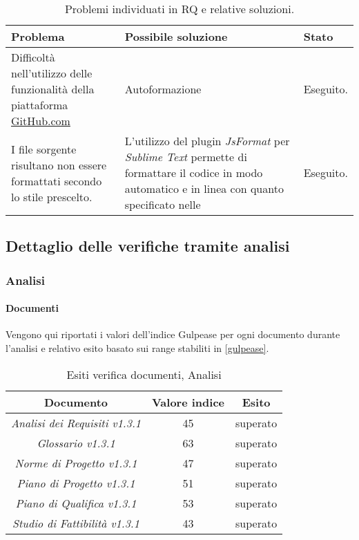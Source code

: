 		\begin{table}[H]
	    \begin{tabular}{ | p{5cm} | p{5cm} | p{2cm} | }
			\hline
			Problema & Possibile soluzione & Stato \\ \hline
			Difficoltà nell'utilizzo delle funzionalità della piattaforma \url{GitHub.com} & Autoformazione & Eseguito. \\ \hline
			I file sorgente risultano non essere formattati secondo lo stile prescelto. & L'utilizzo del plugin \emph{JsFormat} per \emph{Sublime Text} permette di formattare il codice in modo automatico e in linea con quanto specificato nelle \NormeDiProgetto{} & Eseguito. \\ \hline
	    \end{tabular}
	    	\caption{Problemi individuati in RQ e relative soluzioni.}
		\end{table}

	 
	 \subsection{Dettaglio delle verifiche tramite analisi}
	 \label{DettaglioVerificheAnalisi}
	 
	 	\subsubsection{Analisi}
	 	\paragraph{Documenti}
	 	Vengono qui riportati i valori dell’indice Gulpease per ogni documento durante l'analisi e relativo esito basato sui range stabiliti in \ref{gulpease}.
	
		\begin{table}[H]
		\centering
		\begin{tabular}{ | c | c | c | }
	    \hline
	    Documento & Valore indice & Esito \\ \hline
	     \emph{Analisi dei Requisiti v1.3.1} & 45 &  superato \\ \hline
	     \emph{Glossario v1.3.1} & 63 &  superato \\ \hline
	     \emph{Norme di Progetto v1.3.1} & 47 &  superato \\ \hline
	     \emph{Piano di Progetto v1.3.1} & 51 &  superato \\ \hline
	     \emph{Piano di Qualifica v1.3.1} & 53 &  superato \\ \hline
	     \emph{Studio di Fattibilità v1.3.1} & 43 &  superato \\ \hline
	    \end{tabular}
		\caption{Esiti verifica documenti, Analisi}
		\end{table}
		
